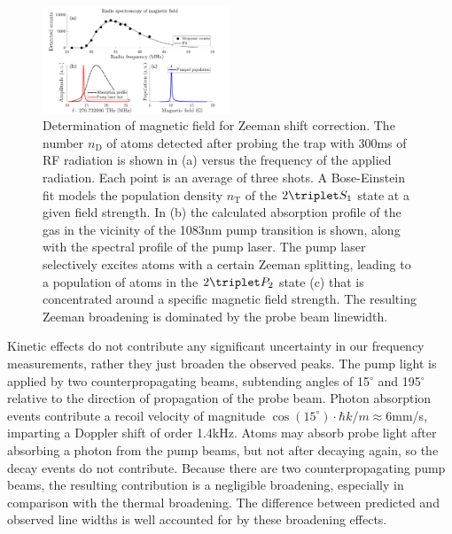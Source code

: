 \begin{figure}[b]
\includegraphics[width=0.5\textwidth]{fig/spectroscopy/rf_spec_subfig-eps-converted-to.pdf}
\caption{Determination of magnetic field for Zeeman shift correction. The number $n_\text{D}$ of atoms detected after probing the trap with 300ms of RF radiation is shown in (a) versus the frequency of the applied radiation. Each point is an average of three shots. A Bose-Einstein fit models the population density $n_\text{T}$ of the $2\triplet S_1$ state at a given field strength. In (b) the calculated absorption profile of the gas in the vicinity of the 1083nm pump transition is shown, along with the spectral profile of the pump laser. The pump laser selectively excites atoms with a certain Zeeman splitting, leading to a population of atoms in the $2\triplet P_2$ state (c) that is concentrated around a specific magnetic field strength. The resulting Zeeman broadening is dominated by the probe beam linewidth.}
\label{fig:RF_spec}
\end{figure}



Kinetic effects do not contribute any significant uncertainty in our frequency measurements, rather they just broaden the observed peaks. The pump light is applied by two counterpropagating beams, subtending angles of 15$^\circ$ and 195$^\circ$ relative to the direction of propagation of the probe beam. Photon absorption events contribute a recoil velocity of magnitude $\cos(15^\circ)\cdot\hbar k/m\approx6$mm/s, imparting a Doppler shift of order 1.4kHz. Atoms may absorb probe light after absorbing a photon from the pump beams, but not after decaying again, so the decay events do not contribute. Because there are two counterpropagating pump beams, the resulting contribution is a negligible broadening, especially in comparison with the thermal broadening. The difference between predicted and observed line widths is well accounted for by these broadening effects.

